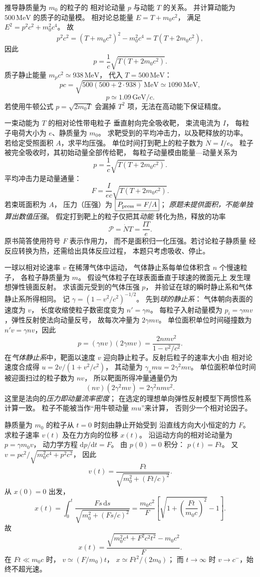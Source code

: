 推导静质量为 $m_0$ 的粒子的
相对论动量 $p$ 与动能 $T$ 的关系。
并计算动能为 $500\,\mathrm{MeV}$
的质子的动量模。
\exsolution
相对论总能量
$E=T+m_0c^2$，
满足
$E^2=p^2c^2+m_0^2c^4$。
故
\[
p^2c^2=(T+m_0c^2)^2-m_0^2c^4
=T(T+2m_0c^2),
\]
因此
\[
\boxed{p=\frac1c
\sqrt{T(T+2m_0c^2)}}.
\]
质子静止能量
$m_pc^2\simeq938\,\mathrm{MeV}$，
代入 $T=500\,\mathrm{MeV}$：
\[
pc=\sqrt{500(500+2\cdot938)}\,\mathrm{MeV}
\simeq1090\,\mathrm{MeV},
\]
\[
\boxed{p\simeq1.09\,\mathrm{GeV}/c}.
\]
\excheck 若使用牛顿公式 $p=\sqrt{2m_0T}$
会漏掉 $T^2$ 项，无法在高动能下保证精度。

一束动能为 $T$ 的相对论性带电粒子
垂直射向完全吸收靶，
束流电流为 $I$，
每粒子电荷大小为 $e$、静质量为 $m_0$。
求靶受到的平均冲击力，以及靶释放的功率。
若给定受照面积 $A$，求平均压强。
\exsolution
单位时间打到靶上的粒子数为
$\dot N=I/e$。
粒子被完全吸收时，其初始动量全部传给靶，
每粒子动量模由能量—动量关系为
\[
p=\frac1c\sqrt{T(T+2m_0c^2)}.
\]
平均冲击力是动量通量：
\[
\boxed{F=\frac{I}{ec}
\sqrt{T(T+2m_0c^2)}}.
\]
若束斑面积为 $A$，
压力（压强）为
$\boxed{P_{\rm press}=F/A}$；
\emph{原题未提供面积，不能单独算出数值压强}。
假定打到靶上的粒子仅把其\emph{动能}
转化为热，释放的功率
\[
\boxed{\mathcal P=\dot NT=\frac{IT}{e}}.
\]
\excheck 原书简答使用符号 $F$ 表示作用力，
而不是面积归一化压强。若讨论粒子静质量
经反应转换为热，还需给出具体反应过程，
本题只考虑吸收、停止。

一球以相对论速率 $v$ 在稀薄气体中运动，
气体静止系每单位体积含 $n$ 个慢速粒子，
各粒子静质量为 $m$。
假设气体粒子在球表面垂直于球速的微面元上
发生理想弹性镜面反射。
求该面元受到的气体压强 $p$，
并验证在球的瞬时静止系和气体静止系所得相同。
\exsolution
记 $\gamma=(1-v^2/c^2)^{-1/2}$。
先到\emph{球的静止系}：
气体朝向表面的速度为 $v$，
长度收缩使粒子数密度变为
$n'=\gamma n$。
每粒子入射动量模为
$p_i=\gamma mv$，弹性反射使法向动量反号，
故每次冲量为 $2\gamma mv$。
单位面积单位时间碰撞数为
$n'v=\gamma nv$，因此
\[
\boxed{p=(\gamma nv)(2\gamma mv)
=\frac{2nmv^2}{1-v^2/c^2}}.
\]
在\emph{气体静止系}中，靶面以速度 $v$
迎向静止粒子。反射后粒子的速率大小由
相对论速度合成得
$u=2v/(1+v^2/c^2)$，
其动量为
$\gamma_u m u=2\gamma^2mv$。
单位面积单位时间被迎面扫过的粒子数为 $nv$，
所以靶面所得冲量通量仍为
\[
(nv)(2\gamma^2mv)=2\gamma^2nmv^2.
\]
\excheck 这里是法向的\emph{压力即动量流率密度}；
在选定的理想单向弹性反射模型下两惯性系计算一致。
粒子不能被当作“用牛顿动量 $mu$”来计算，
否则少一个相对论因子。

静质量为 $m_0$ 的粒子从
$t=0$ 时刻由静止开始受到
沿直线方向大小恒定的力 $F$。
求粒子速率 $v(t)$ 及在力方向的位移 $x(t)$。
\exsolution
沿运动方向的相对论动量为
$p=\gamma m_0v$，
动力学方程 $\mathrm dp/\mathrm dt=F$。
由 $p(0)=0$ 积分：
$p(t)=Ft$。
又
$v=pc^2/\sqrt{m_0^2c^4+p^2c^2}$，
因此
\[
\boxed{v(t)=
\frac{F t}{\sqrt{m_0^2+(F t/c)^2}}}.
\]
从 $x(0)=0$ 出发，
\[
x(t)=\int_0^t\frac{F s\,\mathrm ds}
{\sqrt{m_0^2+(Fs/c)^2}}
=\frac{m_0c^2}{F}
\left[\sqrt{1+\left(\frac{F t}{m_0c}\right)^2}-1\right].
\]
故
\[
\boxed{x(t)=\frac{
\sqrt{m_0^2c^4+F^2c^2t^2}-m_0c^2}{F}}.
\]
\excheck 在 $Ft\ll m_0c$ 时，
$v\simeq(F/m_0)t$，
$x\simeq Ft^2/(2m_0)$；
而 $t\to\infty$ 时
$v\to c^-$，始终不超光速。


